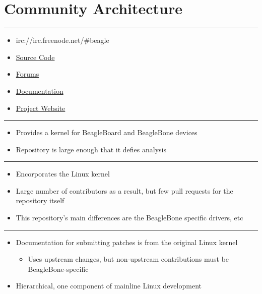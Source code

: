 \section{Community Architecture}\label{community-architecture}

\begin{center}\rule{3in}{0.4pt}\end{center}

\begin{itemize}
\itemsep1pt\parskip0pt
\item
  irc://irc.freenode.net/\#beagle
\item
  \href{https://github.com/beagleboard/linux}{Source Code}
\item
  \href{http://beagleboard.org/Community/Forums/}{Forums}
\item
  \href{http://beagleboard.org/getting-started}{Documentation}
\item
  \href{http://beagleboard.org/}{Project Website}
\end{itemize}

\begin{center}\rule{3in}{0.4pt}\end{center}

\begin{itemize}
\itemsep1pt\parskip0pt
\item
  Provides a kernel for BeagleBoard and BeagleBone devices
\item
  Repository is large enough that it defies analysis
\end{itemize}

\begin{center}\rule{3in}{0.4pt}\end{center}

\begin{itemize}
\itemsep1pt\parskip0pt
\item
  Encorporates the Linux kernel
\item
  Large number of contributors as a result, but few pull requests for
  the repository itself
\item
  This repository's main differences are the BeagleBone specific
  drivers, etc
\end{itemize}

\begin{center}\rule{3in}{0.4pt}\end{center}

\begin{itemize}
\itemsep1pt\parskip0pt
\item
  Documentation for submitting patches is from the original Linux kernel

  \begin{itemize}
  \itemsep1pt\parskip0pt
  \item
    Uses upstream changes, but non-upstream contributions must be
    BeagleBone-specific
  \end{itemize}
\item
  Hierarchical, one component of mainline Linux development
\end{itemize}

